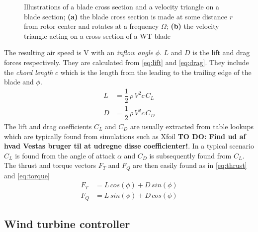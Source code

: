 \begin{figure}[!t]
	\centering
	\hfil
	\caption{Illustrations of a blade cross section and a velocity triangle on a blade section; \textbf{(a)} the blade cross section is made at some distance $ r $ from rotor center and rotates at a frequency $ \Omega $; \textbf{(b)} the velocity triangle acting on a cross section of a WT blade}
	\label{fig:blade_triangles}
\end{figure}

The resulting air speed is V with an \textit{inflow angle} $ \phi $. $ L $ and $ D $ is the lift and drag forces respectively. They are calculated from \cref{eq:lift} and \cref{eq:drag}. They include the \textit{chord length} $ c $ which is the length from the leading to the trailing edge of the blade and $ \phi $.
\begin{align}
	L &= \dfrac{1}{2}\,  \rho \, V^2 c \, C_L \label{eq:lift}\\
	D &= \dfrac{1}{2} \, \rho \, V^2 c \, C_D \label{eq:drag}
\end{align}
The lift and drag coefficients $ C_L $ and $ C_D $ are usually extracted from table lookups which are typically found from simulations such as Xfoil \textbf{TO DO: Find ud af hvad Vestas bruger til at udregne disse coefficienter!}. In a typical scenario $ C_L $ is found from the angle of attack $ \alpha $ and $ C_D $ is subsequently found from $ C_L $. The thrust and torque vectors $ F_T $ and $ F_Q $ are then easily found as in \cref{eq:thrust} and \cref{eq:torque}
\begin{align}
	F_T &= L \, cos(\phi) + D \, sin(\phi) \label{eq:thrust} \\
	F_Q &= L \, sin(\phi) + D \, cos(\phi) \label{eq:torque}
\end{align}


\subsection{Wind turbine controller}